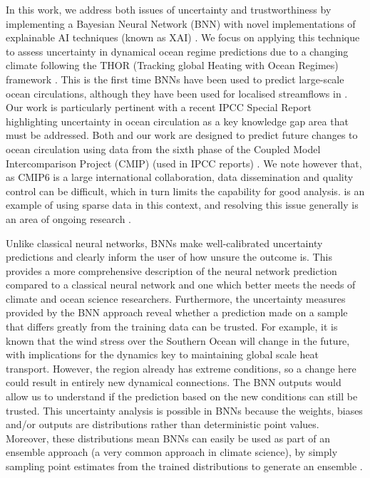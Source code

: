 \documentclass[a4paper]{article}
\begin{document}
In this work, we address both issues of uncertainty and trustworthiness by implementing a Bayesian Neural Network (BNN) \citep{jospin2020hands} with novel implementations of explainable AI techniques (known as XAI) \citep{samek2021explaining}. We focus on applying this technique to assess uncertainty in dynamical ocean regime predictions due to a changing climate following the THOR (Tracking global Heating with Ocean Regimes) framework \citep{THOR}. This is the first time BNNs have been used to predict large-scale ocean circulations, although they have been used for localised streamflows in \cite{rasouli2012daily, rasouli2020forecast}. Our work is particularly pertinent with a recent IPCC Special Report \citep{hoegh2018impacts} highlighting uncertainty in ocean circulation as a key knowledge gap area that must be addressed. Both \citep{THOR} and our work are designed to predict future changes to ocean circulation using data from the sixth phase of the Coupled Model Intercomparison Project (CMIP) (used in IPCC reports) \citep{eyring2015overview}. We note however that, as CMIP6 is a large international collaboration, data dissemination and quality control can be difficult, which in turn limits the capability for good analysis. \cite{THOR} is an example of using sparse data in this context, and resolving this issue generally is an area of ongoing research \citep{eyring2019}.

Unlike classical neural networks, BNNs make well-calibrated uncertainty predictions \citep{mitros2019validity,jospin2020hands} and clearly inform the user of how unsure the outcome is. This provides a more comprehensive description of the neural network prediction compared to a classical neural network and one which better meets the needs of climate and ocean science researchers. Furthermore, the uncertainty measures provided by the BNN approach reveal whether a prediction made on a sample that differs greatly from the training data can be trusted. For example, it is known that the wind stress over the Southern Ocean will change in the future, with implications for the dynamics key to maintaining global scale heat transport. However, the region already has extreme conditions, so a change here could result in entirely new dynamical connections. The BNN outputs would allow us to understand if the prediction based on the new conditions can still be trusted. This uncertainty analysis is possible in BNNs because the weights, biases and/or outputs are distributions rather than deterministic point values. Moreover, these distributions mean BNNs can easily be used as part of an ensemble approach (a very common approach in climate science), by simply sampling point estimates from the trained distributions to generate an ensemble \citep{Bykov2020}.
\end{document}
